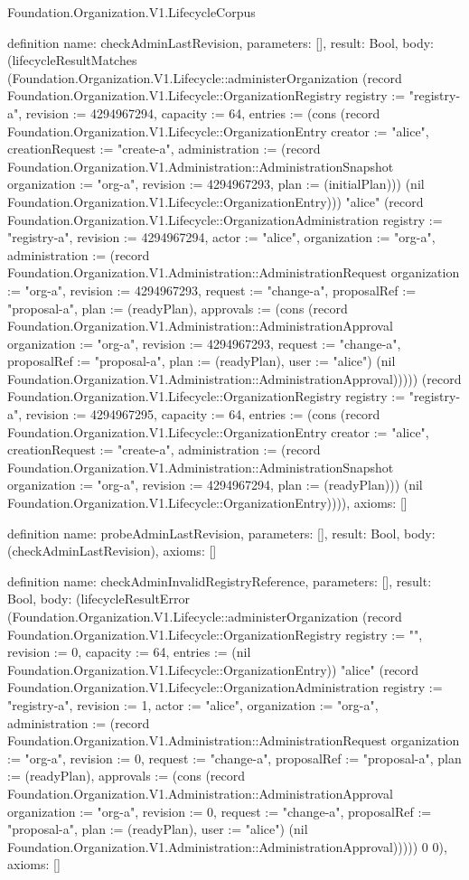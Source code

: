 \begin{lexlean}{Foundation.Organization.V1.LifecycleCorpus}
\begin{semanticmodule}
definition{
  name: checkAdminLastRevision,
  parameters: [],
  result: Bool,
  body: (lifecycleResultMatches (Foundation.Organization.V1.Lifecycle::administerOrganization (record Foundation.Organization.V1.Lifecycle::OrganizationRegistry {registry := "registry-a", revision := 4294967294, capacity := 64, entries := (cons (record Foundation.Organization.V1.Lifecycle::OrganizationEntry {creator := "alice", creationRequest := "create-a", administration := (record Foundation.Organization.V1.Administration::AdministrationSnapshot {organization := "org-a", revision := 4294967293, plan := (initialPlan)})}) (nil Foundation.Organization.V1.Lifecycle::OrganizationEntry))}) "alice" (record Foundation.Organization.V1.Lifecycle::OrganizationAdministration {registry := "registry-a", revision := 4294967294, actor := "alice", organization := "org-a", administration := (record Foundation.Organization.V1.Administration::AdministrationRequest {organization := "org-a", revision := 4294967293, request := "change-a", proposalRef := "proposal-a", plan := (readyPlan), approvals := (cons (record Foundation.Organization.V1.Administration::AdministrationApproval {organization := "org-a", revision := 4294967293, request := "change-a", proposalRef := "proposal-a", plan := (readyPlan), user := "alice"}) (nil Foundation.Organization.V1.Administration::AdministrationApproval))})})) (record Foundation.Organization.V1.Lifecycle::OrganizationRegistry {registry := "registry-a", revision := 4294967295, capacity := 64, entries := (cons (record Foundation.Organization.V1.Lifecycle::OrganizationEntry {creator := "alice", creationRequest := "create-a", administration := (record Foundation.Organization.V1.Administration::AdministrationSnapshot {organization := "org-a", revision := 4294967294, plan := (readyPlan)})}) (nil Foundation.Organization.V1.Lifecycle::OrganizationEntry))})),
  axioms: []
}

definition{
  name: probeAdminLastRevision,
  parameters: [],
  result: Bool,
  body: (checkAdminLastRevision),
  axioms: []
}

definition{
  name: checkAdminInvalidRegistryReference,
  parameters: [],
  result: Bool,
  body: (lifecycleResultError (Foundation.Organization.V1.Lifecycle::administerOrganization (record Foundation.Organization.V1.Lifecycle::OrganizationRegistry {registry := "", revision := 0, capacity := 64, entries := (nil Foundation.Organization.V1.Lifecycle::OrganizationEntry)}) "alice" (record Foundation.Organization.V1.Lifecycle::OrganizationAdministration {registry := "registry-a", revision := 1, actor := "alice", organization := "org-a", administration := (record Foundation.Organization.V1.Administration::AdministrationRequest {organization := "org-a", revision := 0, request := "change-a", proposalRef := "proposal-a", plan := (readyPlan), approvals := (cons (record Foundation.Organization.V1.Administration::AdministrationApproval {organization := "org-a", revision := 0, request := "change-a", proposalRef := "proposal-a", plan := (readyPlan), user := "alice"}) (nil Foundation.Organization.V1.Administration::AdministrationApproval))})})) 0 0),
  axioms: []
}


\end{semanticmodule}
\end{lexlean}
